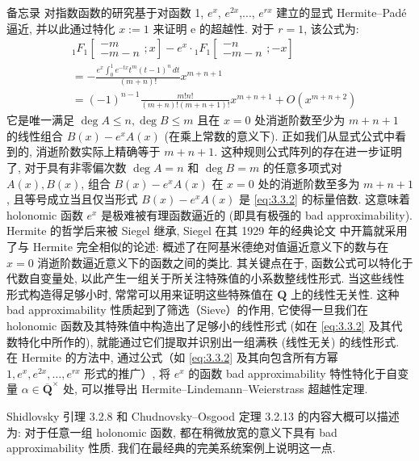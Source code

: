 备忘录 \cite{Her1874} 对指数函数的研究基于对函数 1, \(e^x\), \(e^{2x}\),..., \(e^{rx}\) 建立的显式 Hermite--Pad{\'e} 逼近, 并以此通过特化 \(x := 1\) 来证明 e 的超越性. 
对于 \(r = 1\), 该公式为:
\begin{equation}\label{eq:3.3.2}
    \begin{aligned}
    & {}_{1}F_{1} \left[ \begin{matrix} -m \\ -m-n \end{matrix} ; x \right] - e^x \cdot {}_{1}F_{1} \left[ \begin{matrix} -n \\ -m-n \end{matrix} ; -x \right]  \\
    &= -\frac{e^x \int_{0}^{1} e^{-tx} t^m (t-1)^n \, dt}{(m+n)!} x^{m+n+1} \\
    &= (-1)^{n-1} \frac{m!n!}{(m+n)!(m+n+1)!} x^{m+n+1} + O(x^{m+n+2})
    \end{aligned}
\end{equation}
它是唯一满足 \(\deg A \le n, \deg B \le m\) 且在 \(x = 0\) 处消逝阶数至少为 \(m + n + 1\) 的线性组合 \(B(x) - e^x A(x)\) (在乘上常数的意义下). 
正如我们从显式公式中看到的, 消逝阶数实际上精确等于 \(m+n+1\). 
这种规则公式阵列的存在进一步证明了, 对于具有非零偏次数 \(\deg A = n\) 和 \(\deg B = m\) 的任意多项式对 \(A(x), B(x)\), 
组合 \(B(x) - e^x A(x)\) 在 \(x = 0\) 处的消逝阶数至多为 \(m + n + 1\), 
且等号成立当且仅当形式 \(B(x) - e^x A(x)\) 是 \eqref{eq:3.3.2} 的标量倍数. 
这意味着 holonomic 函数 \(e^x\) 是极难被有理函数逼近的 (即具有极强的 bad approximability). 
Hermite 的哲学后来被 Siegel 继承, Siegel 在其 1929 年的经典论文 \cite{Zan14} 中开篇就采用了与 Hermite \cite{Her1874} 完全相似的论述: 
概述了在阿基米德绝对值逼近意义下的数与在 \(x=0\) 消逝阶数逼近意义下的函数之间的类比. 
其关键点在于, 函数公式可以特化于代数自变量处, 
以此产生一组关于所关注特殊值的小系数整线性形式. 
当这些线性形式构造得足够小时, 常常可以用来证明这些特殊值在 \(\mathbf{Q}\) 上的线性无关性. 
这种 bad approximability 性质起到了筛选（Sieve）的作用, 
它使得一旦我们在 holonomic 函数及其特殊值中构造出了足够小的线性形式 (如在 \eqref{eq:3.3.2} 及其代数特化中所作的), 
就能通过它们提取并识别出一组满秩 (线性无关) 的线性形式. 
在 Hermite 的方法中, 通过公式（如 \eqref{eq:3.3.2} 及其向包含所有方幂 \(1, e^x, e^{2x}, \dots, e^{rx}\) 形式的推广）, 
将 \(e^x\) 的函数 bad approximability 特性特化于自变量 \(\alpha \in \overline{\mathbf{Q}}^{\times}\) 处, 
可以推导出 Hermite--Lindemann--Weierstrass 超越性定理.

Shidlovsky 引理 3.2.8 和 Chudnovsky--Osgood 定理 3.2.13 的内容大概可以描述为: 
对于任意一组 holonomic 函数, 都在稍微放宽的意义下具有 bad approximability 性质. 
我们在最经典的完美系统案例上说明这一点.

